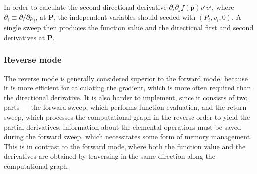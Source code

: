 \documentclass{article}
\begin{document}
In order to calculate the second directional derivative $\partial_i\partial_j f(\bm p) v^iv^j$, where $\partial_i \equiv \partial/\partial p_i$, at $\bm P$, the independent variables should seeded with $(P_i, v_i, 0)$. A single sweep then produces the function value and the directional first and second derivatives at $\bm P$.

\subsubsection{Reverse mode}

The reverse mode is generally considered superior to the forward mode, because it is more efficient for calculating the gradient, which is more often required than the directional derivative. It is also harder to implement, since it consists of two parts --- the forward sweep, which performs function evaluation, and the return sweep, which processes the computational graph in the reverse order to yield the partial derivatives. Information about the elemental operations must be saved during the forward sweep, which necessitates some form of memory management. This is in contrast to the forward mode, where both the function value and the derivatives are obtained by traversing in the same direction along the computational graph.
\end{document}
